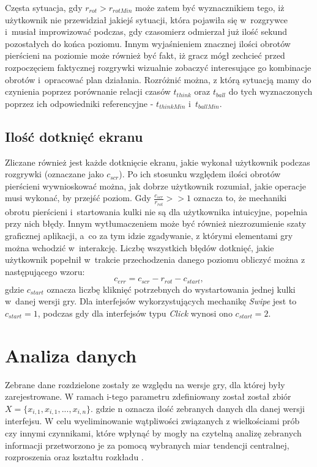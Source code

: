 \documentclass[a4paper,12pt,numbers=noenddot]{report}
\begin{document}
Częsta sytuacja, gdy $r_{rot} > r_{rotMin}$  może zatem być wyznacznikiem tego, iż użytkownik nie przewidział jakiejś sytuacji, która pojawiła się w~rozgrywce i~musiał improwizować podczas, gdy czasomierz odmierzał już ilość sekund pozostałych do końca poziomu. Innym wyjaśnieniem znacznej ilości obrotów pierścieni na poziomie może również być fakt, iż gracz mógł zechcieć przed rozpoczęciem faktycznej rozgrywki wizualnie zobaczyć interesujące go kombinacje obrotów i~opracować plan działania. Rozróżnić można, z którą sytuacją mamy do czynienia poprzez porównanie relacji czasów $t_{think}$ oraz $t_{ball}$ do tych wyznaczonych poprzez ich odpowiedniki referencyjne - $t_{thinkMin}$ i~$t_{ballMin}$.
	\subsection{Ilość dotknięć ekranu}
Zliczane również jest każde dotknięcie ekranu, jakie wykonał użytkownik podczas rozgrywki (oznaczane jako $c_{scr}$). Po ich stosunku względem ilości obrotów pierścieni wywnioskować można, jak dobrze użytkownik rozumiał, jakie operacje musi wykonać, by przejść poziom. Gdy $\frac{c_{scr}}{r_{rot}} >> 1$ oznacza to, że mechaniki obrotu pierścieni i~startowania kulki nie są dla użytkownika intuicyjne, popełnia przy nich błędy. Innym wytłumaczeniem może być również niezrozumienie szaty graficznej aplikacji, a~co za tym idzie zgadywanie, z którymi elementami gry można wchodzić w~interakcję. Liczbę wszystkich błędów dotknięć, jakie użytkownik popełnił w~trakcie przechodzenia danego poziomu obliczyć można z następującego wzoru:
\begin{equation}
\label{eq_errors}
c_{err} = c_{scr} - r_{rot} - c_{start},
\end{equation}
gdzie  $c_{start}$ oznacza liczbę kliknięć potrzebnych do wystartowania jednej kulki w~danej wersji gry. Dla interfejsów wykorzystujących mechanikę \textit{Swipe} jest to $c_{start} = 1$, podczas gdy dla interfejsów typu \textit{Click} wynosi ono $c_{start} = 2$.
\section{Analiza danych}
Zebrane dane rozdzielone zostały ze względu na wersje gry, dla której były zarejestrowane. W ramach i-tego parametru zdefiniowany został został zbiór $X = \{x_{i,1},x_{i,1},..., x_{i,n}\}$. gdzie n oznacza ilość zebranych danych dla danej wersji interfejsu. W celu wyeliminowanie wątpliwości związanych z wielkościami prób czy innymi czynnikami, które wpłynąć by mogły na czytelną analizę zebranych informacji przetworzono je za pomocą wybranych miar tendencji centralnej, rozproszenia oraz kształtu rozkładu \cite{online_Statistics}.
\end{document}
